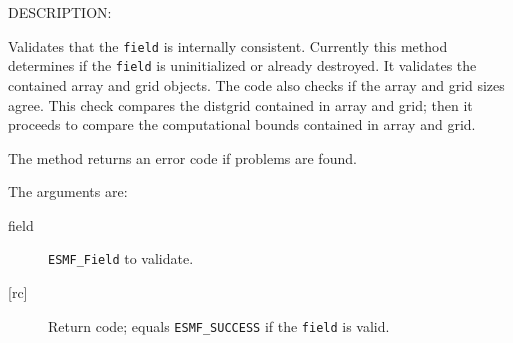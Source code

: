 {\sf DESCRIPTION:\\ }


        Validates that the {\tt field} is internally consistent.
        Currently this method determines if the {\tt field} is uninitialized 
        or already destroyed. It validates the contained array and grid objects.
        The code also checks if the array and grid sizes agree.
        This check compares the distgrid contained in array and grid; 
        then it proceeds to compare the computational bounds contained 
        in array and grid. 
  
        The method returns an error code if problems are found.  
  
       The arguments are:
       \begin{description}
       \item [field]
             {\tt ESMF\_Field} to validate.
       \item [{[rc]}]
             Return code; equals {\tt ESMF\_SUCCESS} if the {\tt field} 
             is valid.
       \end{description}
  
\setlength{\parskip}{\oldparskip}
\setlength{\parindent}{\oldparindent}
\setlength{\baselineskip}{\oldbaselineskip}
